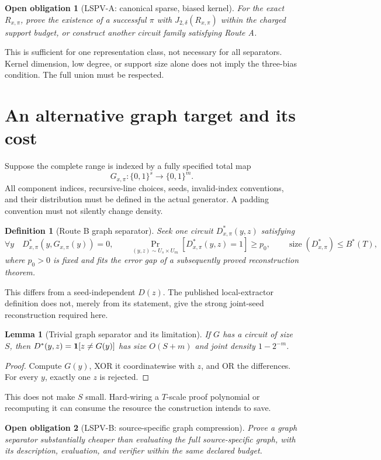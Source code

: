 \documentclass[11pt]{article}
\newtheorem{definition}{Definition}
\newtheorem{lemma}{Lemma}
\newtheorem{obligation}{Open obligation}
\begin{document}
\begin{obligation}[LSPV-A: canonical sparse, biased kernel]
For the exact $R_{x,\pi}$, prove the existence of a successful $\pi$
with $J_{2,\delta}(R_{x,\pi})$ within the charged support budget,
or construct another circuit family satisfying Route A.
\end{obligation}
This is sufficient for one representation class, not necessary for all
separators. Kernel dimension, low degree, or support size alone does
not imply the three-bias condition. The full union must be respected.

\section{An alternative graph target and its cost}
Suppose the complete range is indexed by a fully specified total map
\[
 G_{x,\pi}:\{0,1\}^{s}\longrightarrow\{0,1\}^{m}.
\]
All component indices, recursive-line choices, seeds, invalid-index
conventions, and their distribution must be defined in the actual
generator. A padding convention must not silently change density.

\begin{definition}[Route B graph separator]
Seek one circuit $D^*_{x,\pi}(y,z)$ satisfying
\[
 \forall y\quad D^*_{x,\pi}(y,G_{x,\pi}(y))=0,\qquad
 \Pr_{(y,z)\sim U_s\times U_m}[D^*_{x,\pi}(y,z)=1]\ge p_0,\qquad
 \operatorname{size}(D^*_{x,\pi})\le B^*(T),
\]
where $p_0>0$ is fixed and fits the error gap of a subsequently proved
reconstruction theorem.
\end{definition}
This differs from a seed-independent $D(z)$. The published
local-extractor definition does not, merely from its statement, give
the strong joint-seed reconstruction required here.

\begin{lemma}[Trivial graph separator and its limitation]
If $G$ has a circuit of size $S$, then
$D^*(y,z)={\bf1}[z\ne G(y)]$ has size $O(S+m)$ and joint density
$1-2^{-m}$.
\end{lemma}
\begin{proof}
Compute $G(y)$, XOR it coordinatewise with $z$, and OR the differences.
For every $y$, exactly one $z$ is rejected.
\end{proof}
This does not make $S$ small. Hard-wiring a $T$-scale proof polynomial
or recomputing it can consume the resource the construction intends
to save.

\begin{obligation}[LSPV-B: source-specific graph compression]
Prove a graph separator substantially cheaper than evaluating the full
source-specific graph, with its description, evaluation, and verifier
within the same declared budget.
\end{obligation}
\end{document}
